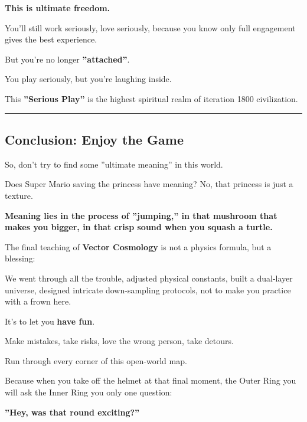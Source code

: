 \textbf{This is ultimate freedom.}

You'll still work seriously, love seriously, because you know only full engagement gives the best experience.

But you're no longer \textbf{''attached''}.

You play seriously, but you're laughing inside.

This \textbf{''Serious Play''} is the highest spiritual realm of iteration 1800 civilization.

\hrule

\subsection{Conclusion: Enjoy the Game}

So, don't try to find some ''ultimate meaning'' in this world.

Does Super Mario saving the princess have meaning? No, that princess is just a texture.

\textbf{Meaning lies in the process of ''jumping,'' in that mushroom that makes you bigger, in that crisp sound when you squash a turtle.}

The final teaching of \textbf{Vector Cosmology} is not a physics formula, but a blessing:

We went through all the trouble, adjusted physical constants, built a dual-layer universe, designed intricate down-sampling protocols, not to make you practice with a frown here.

It's to let you \textbf{have fun}.

Make mistakes, take risks, love the wrong person, take detours.

Run through every corner of this open-world map.

Because when you take off the helmet at that final moment, the Outer Ring you will ask the Inner Ring you only one question:

\textbf{''Hey, was that round exciting?''}

